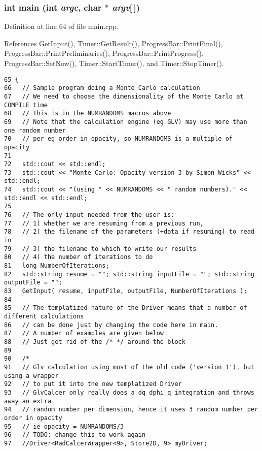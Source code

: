 \subsubsection{\setlength{\rightskip}{0pt plus 5cm}int main (int {\em argc}, char $\ast$ {\em argv}[$\,$])}\label{main_8cpp_0ddf1224851353fc92bfbff6f499fa97}




Definition at line 64 of file main.cpp.

References GetInput(), Timer::GetResult(), ProgressBar::PrintFinal(), ProgressBar::PrintPreliminaries(), ProgressBar::PrintProgress(), ProgressBar::SetNow(), Timer::StartTimer(), and Timer::StopTimer().

\begin{Code}\begin{verbatim}65 {
66   // Sample program doing a Monte Carlo calculation
67   // We need to choose the dimensionality of the Monte Carlo at COMPILE time
68   // This is in the NUMRANDOMS macros above
69   // Note that the calculation engine (eg GLV) may use more than one random number
70   // per eg order in opacity, so NUMRANDOMS is a multiple of opacity
71 
72   std::cout << std::endl;
73   std::cout << "Monte Carlo: Opacity version 3 by Simon Wicks" << std::endl;
74   std::cout << "(using " << NUMRANDOMS << " random numbers)." << std::endl << std::endl;
75 
76   // The only input needed from the user is:
77   // 1) whether we are resuming from a previous run,
78   // 2) the filename of the parameters (+data if resuming) to read in
79   // 3) the filename to which to write our results
80   // 4) the number of iterations to do
81   long NumberOfIterations;
82   std::string resume = ""; std::string inputFile = ""; std::string outputFile = "";
83   GetInput( resume, inputFile, outputFile, NumberOfIterations );
84 
85   // The templatized nature of the Driver means that a number of different calculations
86   // can be done just by changing the code here in main.
87   // A number of examples are given below
88   // Just get rid of the /* */ around the block
89 
90   /*
91   // Glv calculation using most of the old code ('version 1'), but using a wrapper
92   // to put it into the new templatized Driver
93   // GlvCalcer only really does a dq dphi_q integration and throws away an extra
94   // random number per dimension, hence it uses 3 random number per order in opacity
95   // ie opacity = NUMRANDOMS/3
96   // TODO: change this to work again
97   //Driver<RadCalcerWrapper<9>, Store2D, 9> myDriver;

\end{verbatim}
\end{Code}

